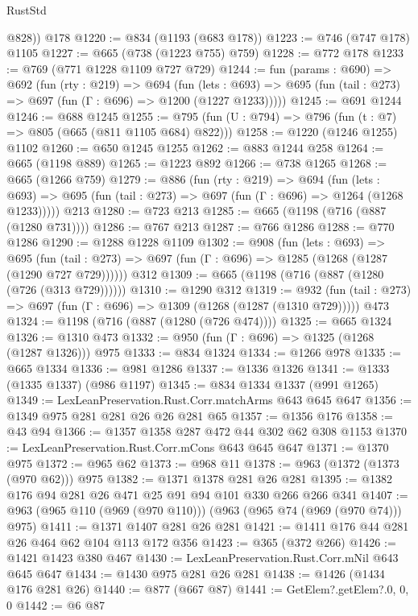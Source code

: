 \begin{lexlean}{RustStd}
\begin{coremodule}
{\begin{coremodule}
{{{{{{{        @828))
    @178
@1220 := @834 (@1193 (@683 @178))
@1223 := @746 (@747 @178) @1105
@1227 := @665 (@738 (@1223 @755) @759)
@1228 := @772 @178
@1233 := @769 (@771 @1228 @1109 @727 @729)
@1244 := fun (params : @690) =>
  @692
    (fun (rty : @219) =>
    @694
      (fun (lets : @693) =>
      @695 (fun (tail : @273) => @697 (fun (Γ : @696) => @1200 (@1227 @1233)))))
@1245 := @691 @1244
@1246 := @688 @1245
@1255 := @795 (fun (U : @794) => @796 (fun (t : @7) => @805 (@665 (@811 @1105 @684) @822)))
@1258 := @1220 (@1246 @1255) @1102
@1260 := @650 @1245 @1255
@1262 := @883 @1244 @258
@1264 := @665 (@1198 @889)
@1265 := @1223 @892
@1266 := @738 @1265
@1268 := @665 (@1266 @759)
@1279 := @886
    (fun (rty : @219) =>
    @694
      (fun (lets : @693) =>
      @695 (fun (tail : @273) => @697 (fun (Γ : @696) => @1264 (@1268 @1233)))))
    @213
@1280 := @723 @213
@1285 := @665 (@1198 (@716 (@887 (@1280 @731))))
@1286 := @767 @213
@1287 := @766 @1286
@1288 := @770 @1286
@1290 := @1288 @1228 @1109
@1302 := @908
    (fun (lets : @693) =>
    @695 (fun (tail : @273) => @697 (fun (Γ : @696) => @1285 (@1268 (@1287 (@1290 @727 @729))))))
    @312
@1309 := @665 (@1198 (@716 (@887 (@1280 (@726 (@313 @729))))))
@1310 := @1290 @312
@1319 := @932
    (fun (tail : @273) => @697 (fun (Γ : @696) => @1309 (@1268 (@1287 (@1310 @729)))))
    @473
@1324 := @1198 (@716 (@887 (@1280 (@726 @474))))
@1325 := @665 @1324
@1326 := @1310 @473
@1332 := @950 (fun (Γ : @696) => @1325 (@1268 (@1287 @1326))) @975
@1333 := @834 @1324
@1334 := @1266 @978
@1335 := @665 @1334
@1336 := @981 @1286
@1337 := @1336 @1326
@1341 := @1333 (@1335 @1337) (@986 @1197)
@1345 := @834 @1334 @1337 (@991 @1265)
@1349 := LexLeanPreservation.Rust.Corr.matchArms @643 @645 @647
@1356 := @1349 @975 @281 @281 @26 @26 @281 @65
@1357 := @1356 @176
@1358 := @43 @94
@1366 := @1357 @1358 @287 @472 @44 @302 @62 @308 @1153
@1370 := LexLeanPreservation.Rust.Corr.mCons @643 @645 @647
@1371 := @1370 @975
@1372 := @965 @62
@1373 := @968 @11
@1378 := @963 (@1372 (@1373 (@970 @62))) @975
@1382 := @1371 @1378 @281 @26 @281
@1395 := @1382 @176 @94 @281 @26 @471 @25 @91 @94 @101 @330 @266 @266 @341
@1407 := @963 (@965 @110 (@969 (@970 @110))) (@963 (@965 @74 (@969 (@970 @74))) @975)
@1411 := @1371 @1407 @281 @26 @281
@1421 := @1411 @176 @44 @281 @26 @464 @62 @104 @113 @172 @356
@1423 := @365 (@372 @266)
@1426 := @1421 @1423 @380 @467
@1430 := LexLeanPreservation.Rust.Corr.mNil @643 @645 @647
@1434 := @1430 @975 @281 @26 @281
@1438 := @1426 (@1434 @176 @281 @26)
@1440 := @877 (@667 @87)
@1441 := GetElem?.getElem?.{0, 0, 0}
@1442 := @6 @87
}}}}}}}
\end{coremodule}}
\end{coremodule}
\end{lexlean}
